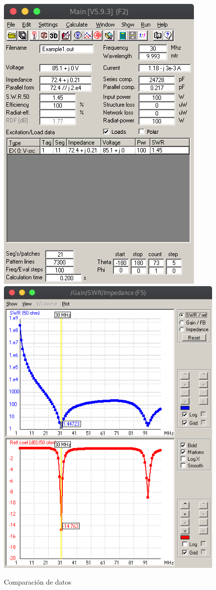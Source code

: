 \documentclass[11pt,a4paper]{article}
\begin{document}
    \begin{figure}[H]
    \centering
    \includegraphics[scale=0.4]{images/dipolo/1dipolomain.png}
    \includegraphics[scale=0.4]{images/dipolo/1dipoloswr.png}
    \caption{Comparaci\'on de datos}
    \label{fig3:yagui2d}
    \end{figure}
\end{document}
